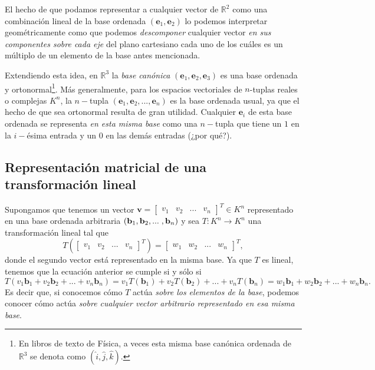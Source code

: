 \documentclass[12pt]{article}
\begin{document}
El hecho de que podamos representar a cualquier vector de $\mathbb{R}^2$ como una combinación lineal de la base ordenada $(\mathbf{e}_1,\mathbf{e}_2)$ lo podemos interpretar geométricamente como que podemos \emph{descomponer} cualquier vector \emph{en sus componentes sobre cada eje} del plano cartesiano \textemdash cada uno de los cuáles es un múltiplo de un elemento de la base antes mencionada.

Extendiendo esta idea, en $\mathbb{R}^3$ la \emph{base canónica} $(\mathbf{e}_1,\mathbf{e}_2,\mathbf{e}_3)$ es una base ordenada y ortonormal\footnote{En libros de texto de Física, a veces esta misma base canónica ordenada de $\mathbb{R}^3$ se denota como $(\hat{i},\hat{j},\hat{k}).$}. Más generalmente, para los espacios vectoriales de $n$-tuplas reales o complejas $K^n$, la $n-$tupla $(\mathbf{e}_1,\mathbf{e}_2,...,\mathbf{e}_n)$ es la base ordenada usual, ya que el hecho de que sea ortonormal resulta de gran utilidad. Cualquier $\mathbf{e}_i$ de esta base ordenada se representa \emph{en esta misma base} como una $n-$tupla que tiene un $1$ en la $i-$ésima entrada y un $0$ en las demás entradas (¿por qué?).  

\subsection{Representación matricial de una transformación lineal}

Supongamos que tenemos un vector $\mathbf{v}=\begin{bmatrix} v_1&v_2&...&v_n \end{bmatrix}^T\in K^n$ representado en una base ordenada arbitraria $(\mathbf{b}_1,\mathbf{b}_2,...\hspace{1mm} ,\mathbf{b}_n)$ y sea $T:K^n\to K^n$ una transformación lineal tal que $$T(\begin{bmatrix} v_1&v_2&...&v_n \end{bmatrix}^T) = \begin{bmatrix} w_1&w_2&...&w_n \end{bmatrix}^T,$$ donde el segundo vector está representado en la misma base. Ya que $T$ es lineal, tenemos que la ecuación anterior se cumple si y sólo si \[ T(v_1\mathbf{b}_1+v_2\mathbf{b}_2+...+v_n\mathbf{b}_n)= v_1T(\mathbf{b}_1)+v_2T(\mathbf{b}_2)+...+v_nT(\mathbf{b}_n)=w_1\mathbf{b}_1 + w_2\mathbf{b}_2+...+w_n\mathbf{b}_n.\] Es decir que, si conocemos cómo $T$ actúa \emph{sobre los elementos de la base}, podemos conocer cómo actúa \emph{sobre cualquier vector arbitrario representado en esa misma base}.
\vspace{3mm}
\end{document}
